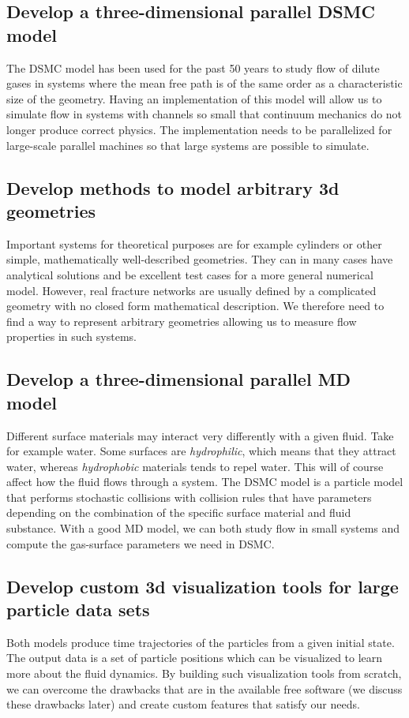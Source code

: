 \subsection{Develop a three-dimensional parallel DSMC model}
The DSMC model has been used for the past 50 years to study flow of dilute gases in systems where the mean free path is of the same order as a characteristic size of the geometry. Having an implementation of this model will allow us to simulate flow in systems with channels so small that continuum mechanics do not longer produce correct physics. The implementation needs to be parallelized for large-scale parallel machines so that large systems are possible to simulate.
\subsection{Develop methods to model arbitrary 3d geometries}
Important systems for theoretical purposes are for example cylinders or other simple, mathematically well-described geometries. They can in many cases have analytical solutions and be excellent test cases for a more general numerical model. However, real fracture networks are usually defined by a complicated geometry with no closed form mathematical description. We therefore need to find a way to represent arbitrary geometries allowing us to measure flow properties in such systems.
\subsection{Develop a three-dimensional parallel MD model}
Different surface materials may interact very differently with a given fluid. Take for example water. Some surfaces are \textit{hydrophilic}, which means that they attract water, whereas \textit{hydrophobic} materials tends to repel water. This will of course affect how the fluid flows through a system. The DSMC model is a particle model that performs stochastic collisions with collision rules that have parameters depending on the combination of the specific surface material and fluid substance. With a good MD model, we can both study flow in small systems and compute the gas-surface parameters we need in DSMC. 

\subsection{Develop custom 3d visualization tools for large particle data sets}
Both models produce time trajectories of the particles from a given initial state. The output data is a set of particle positions which can be visualized to learn more about the fluid dynamics. By building such visualization tools from scratch, we can overcome the drawbacks that are in the available free software (we discuss these drawbacks later) and create custom features that satisfy our needs. 

